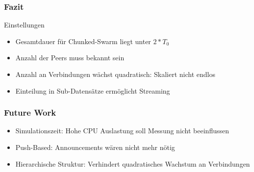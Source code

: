 \begin{frame}
  \frametitle{Fazit}
  
  \begin{block}{Einstellungen}
	  \begin{itemize}  
	    \item Gesamtdauer für Chunked-Swarm liegt unter $2*T_0$
	    \vspace{2mm}
	    \item Anzahl der Peers muss bekannt sein
	    \vspace{2mm}
	    \item Anzahl an Verbindungen wächst quadratisch: Skaliert nicht endlos
	    \vspace{2mm}
	    \item Einteilung in Sub-Datensätze ermöglicht Streaming
	  \end{itemize}		
  \end{block}
\end{frame}


\begin{frame}
  \frametitle{Future Work}
  \begin{itemize}
	  \item Simulationszeit: Hohe CPU Auslastung soll Messung nicht beeinflussen
	  \vspace{1mm}
	  \item Push-Based: Announcements wären nicht mehr nötig
	  \vspace{1mm}
	  \item Hierarchische Struktur: Verhindert quadratisches Wachstum an Verbindungen
  \end{itemize}		
\end{frame}
